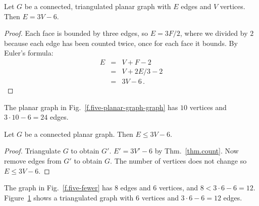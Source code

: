 \begin{theorem}
Let $G$ be a connected, triangulated planar graph with $E$ edges and $V$ vertices. Then $E= 3V-6$.
\end{theorem}
\begin{proof}
Each face is bounded by three edges, so $E=3F/2$, where we divided by $2$ because each edge has been counted twice, once for each face it bounds. By Euler's formula:
\begin{eqnarray*}
E&=&V+F-2\\
&=&V+2E/3-2\\
&=&3V-6\,.
\end{eqnarray*}
\end{proof}

\begin{example}
The planar graph in Fig.~\ref{f.five-planar-graph-graph} has $10$ vertices and $3\cdot 10-6=24$ edges.
\end{example}

\begin{theorem}\label{thm.count}
Let $G$ be a connected planar graph. Then $E\leq 3V-6$.
\end{theorem}

\begin{proof}
Triangulate $G$ to obtain $G'$. $E'= 3V'-6$ by Thm.~\ref{thm.count}. Now remove edges from $G'$ to obtain $G$. The number of vertices does not change so  $E\leq 3V-6$.
\end{proof}

\begin{example}
The graph in Fig.~\ref{f.five-fewer} has $8$ edges and $6$ vertices, and $8< 3\cdot 6 - 6= 12$.
Figure~\ref{f.five-upper-limit} shows a triangulated graph with $6$ vertices and $3\cdot 6 - 6= 12$ edges.
\end{example}

\begin{figure}[t]
\subfigures
{}
\hfill
{}
\label{f.five-fewer}
\label{f.five-upper-limit}
\end{figure}

